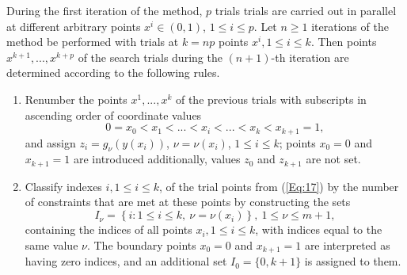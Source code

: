 \documentclass[
11pt,%
tightenlines,%
twoside,%
onecolumn,%
nofloats,%
nobibnotes,%
nofootinbib,%
superscriptaddress,%
noshowpacs,%
centertags]%
{revtex4}
\begin{document}
During the first iteration of the method, $p$ trials trials are carried out in parallel at different arbitrary points $x^i\in(0,1)$, $1\leq i \leq p$.
Let $n\geq 1$ iterations of the method be performed with trials at $k=np$ points $x^i, 1\leq i \leq k$. Then points $x^{k+1},...,x^{k+p}$ of the search trials during the $(n+1)$-th iteration are determined according to the following rules.

\begin{enumerate}
\item
Renumber the points $x^1,...,x^k$ of the previous trials with subscripts in ascending order of coordinate values
\begin{equation}\label{Eq:17}
0=x_0<x_1<...<x_i<...<x_k<x_{k+1}=1,
\end{equation}
and assign $z_i=g_\nu(y(x_i))$, $\nu=\nu(x_i)$, $1 \leq i \leq k$; points $x_0=0$ and $x_{k+1}=1$ are introduced additionally, values $z_0$ and $z_{k+1}$ are not set.
\item
Classify indexes  $i,1\leq i \leq k$, of the trial points from  (\ref{Eq:17}) by the number of constraints that are met at these points by constructing the sets
\begin{equation}\label{Eq:18}
I_\nu = \left\{i: 1 \leq i \leq k,\ \nu = \nu(x_i)\right\},\ 1 \leq \nu \leq m+1,
\end{equation}
containing the indices of all points $x_i,1\leq i \leq k$, with indices equal to the same value $\nu$. The boundary points $x_0=0$ and $x_{k+1}=1$ are interpreted as having zero indices, and an additional set $I_0=\{0,k+1\}$ is assigned to them.


\end{enumerate}
\end{document}
